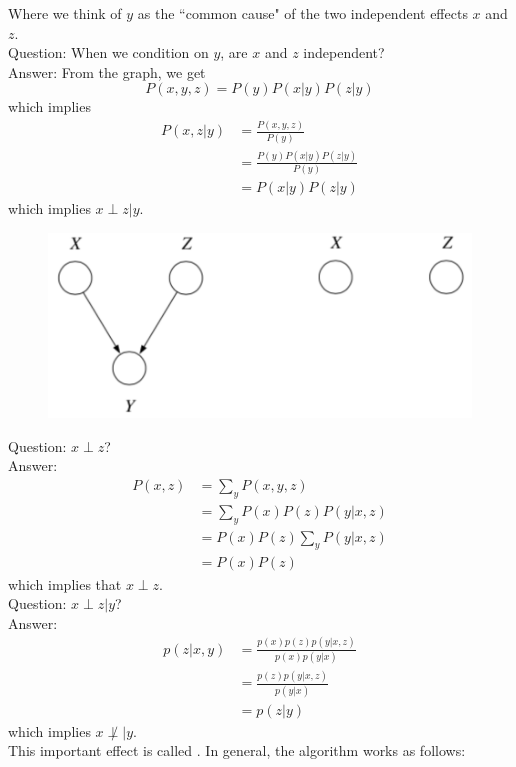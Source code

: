 \documentclass[11pt]{article}
\begin{document}
\noindent Where we think of $y$ as the ``common cause" of the two independent effects $x$ and $z$. \\
Question: When we condition on $y$, are $x$ and $z$ independent? \\
Answer:
From the graph, we get
$$P(x,y,z) = P(y)P(x|y)P(z|y)$$
which implies
\begin{align*}
	P(x,z|y) &= \frac{P(x,y,z)}{P(y)} \\
	&= \frac{P(y)P(x|y)P(z|y)}{P(y)} \\
	&= P(x|y)P(z|y)
\end{align*}
which implies $x\perp z |y$. 
 \begin{figure}[H]
	\centering
	\includegraphics[scale=0.3]{p5.png}
\end{figure}
\noindent Question: $x \perp z$? \\
Answer: \\
\begin{align*}
	P(x,z) &= \sum_y P(x,y,z) \\
	&= \sum_y P(x)P(z)P(y|x,z) \\
	&= P(x)P(z)\sum_y P(y|x,z) \\
	&= P(x)P(z)
\end{align*}
which implies that $x\perp z$.\\
Question: $x \perp z | y$? \\
Answer: 
\begin{align*}
	p(z|x,y) &= \frac{p(x)p(z)p(y|x,z)}{p(x)p(y|x)}\\
	&= \frac{p(z)p(y|x,z)}{p(y|x)} \\
	&= p(z|y)
\end{align*}
which implies $x \not \perp | y$.\\
 This important effect is called .
In general, the algorithm works as follows:
\end{document}
